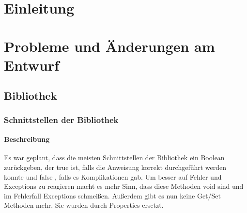 \documentclass[a4paper,12pt]{article}
\title{\projektName}
\date{\today}
\author{Tec O'Brain}
\begin{document}
 \setcounter{page}{2}
 \tableofcontents          %
 \clearpage

\section{Einleitung}
\section{Probleme und Änderungen am Entwurf}

\subsection{Bibliothek}

\subsubsection{Schnittstellen der Bibliothek}
\paragraph{Beschreibung}
Es war geplant, dass die meisten Schnittstellen der Bibliothek ein Boolean zurückgeben, der true ist, falls die Anweisung korrekt durchgeführt werden konnte und false , falls es Komplikationen gab.
Um besser auf Fehler und Exceptions zu reagieren macht es mehr Sinn, dass diese Methoden void sind und im Fehlerfall Exceptions schmeißen. Außerdem gibt es nun keine Get/Set Methoden mehr. Sie wurden durch Properties ersetzt.
\end{document}
